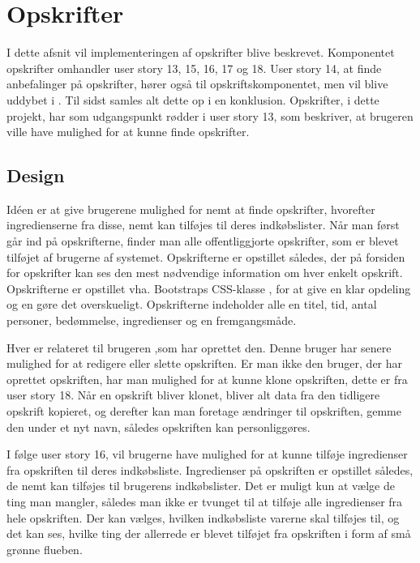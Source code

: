\section{Opskrifter}
I dette afsnit vil implementeringen af opskrifter blive beskrevet. 
Komponentet opskrifter omhandler user story  13, 15, 16, 17 og 18.
User story  14, at finde anbefalinger på opskrifter, hører også til opskriftskomponentet, men vil blive uddybet i . 
Til sidst samles alt dette op i en konklusion. 
Opskrifter, i dette projekt, har som udgangspunkt rødder i user story  13, som beskriver, at brugeren ville have mulighed for at kunne finde opskrifter.

\subsection{Design}
Idéen er at give brugerene mulighed for nemt at finde opskrifter, hvorefter ingredienserne fra disse, nemt kan tilføjes til deres indkøbslister.
Når man først går ind på opskrifterne, finder man alle offentliggjorte opskrifter, som er blevet tilføjet af brugerne af systemet.
Opskrifterne er opstillet således, der på forsiden for opskrifter kan ses den mest nødvendige information om hver enkelt opskrift.
Opskrifterne er opstillet vha. Bootstraps CSS-klasse , for at give en klar opdeling og en gøre det overskueligt.
Opskrifterne indeholder alle en titel, tid, antal personer, bedømmelse, ingredienser og en fremgangsmåde.

Hver  er relateret til brugeren ,som har oprettet den.
Denne bruger har senere mulighed for at redigere eller slette opskriften.
Er man ikke den bruger, der har oprettet opskriften, har man mulighed for at kunne klone opskriften, dette er fra user story  18.
Når en opskrift bliver klonet, bliver alt data fra den tidligere opskrift kopieret, og derefter kan man foretage ændringer til opskriften, gemme den under et nyt navn, således opskriften kan personliggøres.

I følge user story  16, vil brugerne have mulighed for at kunne tilføje ingredienser fra opskriften til deres indkøbsliste.
Ingredienser på opskriften er opstillet således, de nemt kan tilføjes til brugerens indkøbslister.
Det er muligt kun at vælge de ting man mangler, således man ikke er tvunget til at tilføje alle ingredienser fra hele opskriften.
Der kan vælges, hvilken indkøbsliste varerne skal tilføjes til, og det kan ses, hvilke ting der allerrede er blevet tilføjet fra opskriften i form af små grønne flueben.

